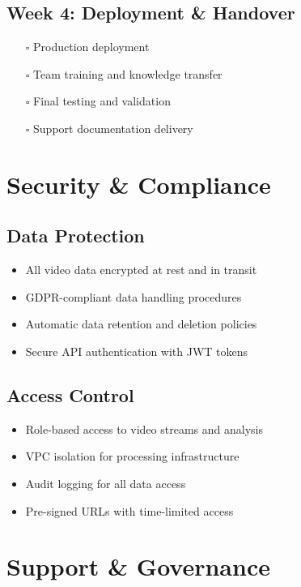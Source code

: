 \documentclass[11pt,a4paper]{article}
\begin{document}
\subsection{Week 4: Deployment \& Handover}
\begin{itemize}[leftmargin=1.5cm]
    \item[\textcolor{clannblue}{$\square$}] Production deployment
    \item[\textcolor{clannblue}{$\square$}] Team training and knowledge transfer
    \item[\textcolor{clannblue}{$\square$}] Final testing and validation
    \item[\textcolor{clannblue}{$\square$}] Support documentation delivery
\end{itemize}

\section{Security \& Compliance}

\subsection{Data Protection}
\begin{itemize}[leftmargin=1.5cm]
    \item All video data encrypted at rest and in transit
    \item GDPR-compliant data handling procedures
    \item Automatic data retention and deletion policies
    \item Secure API authentication with JWT tokens
\end{itemize}

\subsection{Access Control}
\begin{itemize}[leftmargin=1.5cm]
    \item Role-based access to video streams and analysis
    \item VPC isolation for processing infrastructure
    \item Audit logging for all data access
    \item Pre-signed URLs with time-limited access
\end{itemize}

\section{Support \& Governance}
\end{document}
